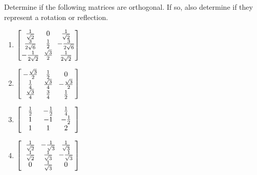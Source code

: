 \begin{Exercise}
Determine if the following matrices are orthogonal. If so, also determine if they represent a rotation or reflection.
\begin{enumerate}[label=(\alph*)]
\item $\left[\begin{array}{wc{15pt}wc{15pt}wc{15pt}}
\frac{1}{\sqrt{2}} & 0 & \frac{1}{\sqrt{2}}\\
\frac{3}{2\sqrt{6}} & \frac{1}{2} & -\frac{3}{2\sqrt{6}}\\
-\frac{1}{2\sqrt{2}} & \frac{\sqrt{3}}{2} & \frac{1}{2\sqrt{2}}
\end{array}\right]$
\item $\left[\begin{array}{wc{15pt}wc{15pt}wc{15pt}}
-\frac{\sqrt{3}}{2} & \frac{1}{2} & 0\\
\frac{1}{4} & \frac{\sqrt{3}}{4} & -\frac{\sqrt{3}}{2}\\
\frac{\sqrt{3}}{4} & \frac{3}{4} & \frac{1}{2}
\end{array}\right]$
\item $\left[\begin{array}{wc{15pt}wc{15pt}wc{15pt}}
\frac{1}{2}&-\frac{1}{2}&\frac{1}{4}\\
1&-1&-\frac{1}{2}\\ 
1&1&2 \end{array}\right]$
\item $\left[\begin{array}{wc{15pt}wc{15pt}wc{15pt}}
\frac{1}{\sqrt{2}} & -\frac{1}{\sqrt{3}} & \frac{1}{\sqrt{3}}\\
\frac{1}{\sqrt{2}} & \frac{1}{\sqrt{3}} & -\frac{1}{\sqrt{3}}\\
0 & \frac{1}{\sqrt{3}} & 0
\end{array}\right]$
\end{enumerate}
\end{Exercise}
